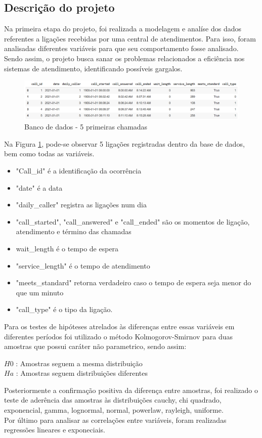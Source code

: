 \subsection{Descrição do projeto}
Na primeira etapa do projeto, foi realizada a modelagem e analíse dos dados referentes a ligações recebidas por uma central de atendimentos. Para isso, foram analisadas diferentes variáveis para que seu comportamento fosse analisado. Sendo assim, o projeto busca sanar os problemas relacionados a eficiência nos sistemas de atendimento, identificando possíveis gargalos.\\
\begin{figure}[H]
    \includegraphics[scale= 0.6]{introducao/imgintro.png}
    \caption{Banco de dados - 5 primeiras chamadas}
    \label{fig: bd_img}
\end{figure}
Na Figura \ref*{fig: bd_img}, pode-se observar 5 ligações registradas dentro da base de dados, bem como todas as variáveis.
\begin{itemize} 
    \item"Call\_id" é a identificação da ocorrência
    \item"date" é a data
    \item "daily\_caller" registra as ligações num dia
    \item"call\_started", "call\_answered" e "call\_ended" são os momentos de ligação, atendimento e término das chamadas
    \item wait\_length é o tempo de espera
    \item"service\_length" é o tempo de atendimento
    \item"meets\_standard" retorna verdadeiro caso o tempo de espera seja menor do que um minuto 
    \item"call\_type" é o tipo da ligação.
\end{itemize}
Para os testes de hipóteses atrelados às diferenças entre essas variáveis em diferentes períodos foi utilizado o método Kolmogorov-Smirnov para duas amostras que possui caráter não parametrico, sendo assim:\\
\begin{center}
$H{0}$ : Amostras seguem a mesma distribuição\\
$H{a}$ : Amostras seguem distribuições diferentes
\end{center}
Posteriormente a confirmação positiva da diferença entre amostras, foi realizado o teste de aderência das amostras às distribuições cauchy, chi quadrado, exponencial, gamma, lognormal, normal, powerlaw, rayleigh, uniforme.\\
Por último para analisar as correlações entre variáveis, foram realizadas regressões lineares e exponeciais.\\

